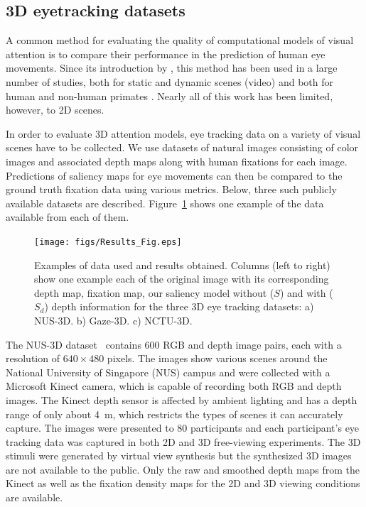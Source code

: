 \documentclass[12pt]{article}
\begin{document}
\subsection{3D eyetracking datasets}
A common method for evaluating the quality of computational models of
visual attention is to compare their performance in the prediction of
human eye movements. Since its introduction by
\cite{Parkhurst_etal02a}, this method has been used in a large number
of studies, both for static and dynamic scenes (video) and both for
human and non-human primates \citep[for a recent review
see][]{Borji_Itti13}.  Nearly all of this work has been limited,
however, to 2D scenes.

In order to evaluate 3D  attention models, eye tracking data
on a variety of visual scenes have to be collected.
We use  datasets  of natural images consisting of color images and
associated depth maps along with human fixations for each
image.  Predictions of saliency maps for eye movements can then be
compared to the ground truth fixation data using various
metrics. Below, three such publicly available datasets are
described. Figure~\ref{Fig:Results} shows one example of the data
available from each of them. 

\begin{figure}%
\hfill
\begin{center}
\texttt{[image: figs/Results\_Fig.eps]}
\end{center}
\caption{Examples of data used and results obtained. Columns (left to
  right) show one example each of the original image with its corresponding
  depth map, fixation map, our saliency model without ($S$) and with
  ($S_d$) depth information for the three 3D eye tracking datasets: a)
  NUS-3D. b) Gaze-3D. c) NCTU-3D.}
\label{Fig:Results}
\end{figure}

The NUS-3D dataset~\citep{Lang_etal12} contains 600 RGB and depth
image pairs, each with a resolution of $640\times480$ pixels. The
images show various scenes around the National University of Singapore
(NUS) campus and were collected with a Microsoft Kinect camera, which
is capable of recording both RGB and depth images. The Kinect depth
sensor is affected by ambient lighting and has a depth range of only
about 4~m, which restricts the types of scenes it can accurately
capture. The images were presented to 80 participants
and each participant's eye tracking data was captured in
both 2D and 3D free-viewing experiments. The 3D stimuli were generated
by virtual view synthesis \cite[see][for details]{Lang_etal12} but the
synthesized 3D images are not available to the public. Only the raw
and smoothed depth maps from the Kinect as well as the fixation density
maps for the 2D and 3D viewing conditions are available.
\end{document}
